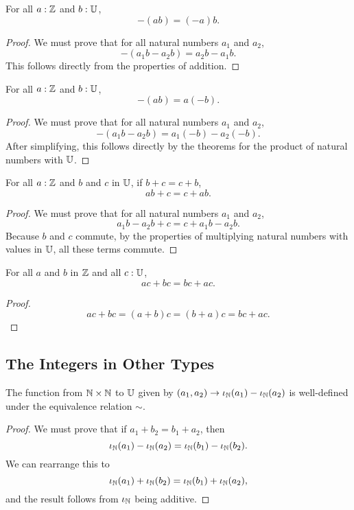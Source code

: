 \documentclass[../../math.tex]{subfiles}
\begin{document}
\begin{theorem}
    For all $a : \mathbb{Z}$ and $b : \mathbb{U}$,
    \[
        -(ab) = (-a)b.
    \]
\end{theorem}
\begin{proof}
    We must prove that for all natural numbers $a_1$ and $a_2$,
    \[
        -(a_1b - a_2b) = a_2b - a_1b.
    \]
    This follows directly from the properties of addition.
\end{proof}

\begin{theorem}
    For all $a : \mathbb{Z}$ and $b : \mathbb{U}$,
    \[
        -(ab) = a(-b).
    \]
\end{theorem}
\begin{proof}
    We must prove that for all natural numbers $a_1$ and $a_2$,
    \[
        -(a_1b - a_2b) = a_1(-b) - a_2(-b).
    \]
    After simplifying, this follows directly by the theorems for the product of
    natural numbers with $\mathbb{U}$.
\end{proof}

\begin{theorem}
    For all $a : \mathbb{Z}$ and $b$ and $c$ in $\mathbb{U}$, if $b + c = c + b$,
    \[
        ab + c = c + ab.
    \]
\end{theorem}
\begin{proof}
    We must prove that for all natural numbers $a_1$ and $a_2$,
    \[
        a_1b - a_2b + c = c + a_1b - a_2b.
    \]
    Because $b$ and $c$ commute, by the properties of multiplying natural
    numbers with values in $\mathbb{U}$, all these terms commute.
\end{proof}

\begin{theorem}
    For all $a$ and $b$ in $\mathbb{Z}$ and all $c : \mathbb{U}$,
    \[
        ac + bc = bc + ac.
    \]
\end{theorem}
\begin{proof}
    \[
        ac + bc = (a + b)c = (b + a)c = bc + ac.
    \]
\end{proof}

\subsection{The Integers in Other Types}

\begin{lemma}
    The function from $\mathbb{N} \times \mathbb{N}$ to $\mathbb{U}$ given by $(a_1, a_2) \to
    \iota_{\mathbb{N}}(a_1) - \iota_{\mathbb{N}}(a_2)$ is well-defined under the equivalence relation $\sim$.
\end{lemma}
\begin{proof}
    We must prove that if $a_1 + b_2 = b_1 + a_2$, then
    \[
        \iota_{\mathbb{N}}(a_1) - \iota_{\mathbb{N}}(a_2) = \iota_{\mathbb{N}}(b_1) - \iota_{\mathbb{N}}(b_2).
    \]
    We can rearrange this to
    \[
        \iota_{\mathbb{N}}(a_1) + \iota_{\mathbb{N}}(b_2) = \iota_{\mathbb{N}}(b_1) + \iota_{\mathbb{N}}(a_2),
    \]
    and the result follows from $\iota_{\mathbb{N}}$ being additive.
\end{proof}
\end{document}
